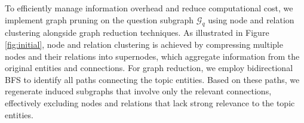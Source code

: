 
To efficiently manage information overhead and reduce computational cost, we implement graph pruning on the question subgraph $\mathcal{G}_q$ using node and relation clustering alongside graph reduction techniques.
As illustrated in Figure \ref{fig:initial}, node and relation clustering is achieved by compressing multiple nodes and their relations into supernodes, which aggregate information from the original entities and connections. 
For graph reduction, we employ bidirectional BFS to identify all paths connecting the topic entities. Based on these paths, we regenerate induced subgraphs that involve only the relevant connections, effectively excluding nodes and relations that lack strong relevance to the topic entities. 



